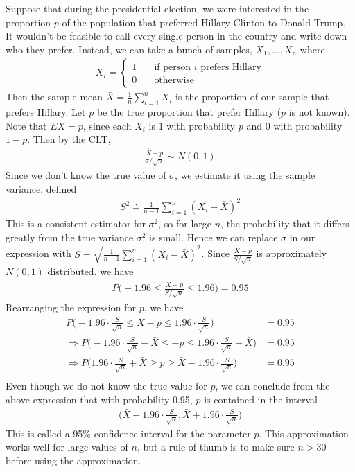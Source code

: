 \documentclass{tufte-book}
\theoremstyle{definition}
\numberwithin{theorem}{section}
\numberwithin{definition}{section}
\numberwithin{lemma}{section}
\numberwithin{corollary}{section}
\numberwithin{proposition}{section}
\numberwithin{remark}{section}
\numberwithin{claim}{section}
\numberwithin{observation}{section}
\numberwithin{fact}{section}
\numberwithin{assumption}{section}
\numberwithin{example}{section}
\numberwithin{exercise}{section}
\begin{document}
Suppose that during the presidential election, we were interested in the proportion $p$ of the population that preferred Hillary Clinton to Donald Trump. It wouldn't be feasible to call every single person in the country and write down who they prefer. Instead, we can take a bunch of samples, $X_1,\dots,X_n$ where
\begin{align*}
X_i = \begin{cases}
1 \hspace{1em} &\text{if person $i$ prefers Hillary} \\
0 &\text{otherwise}
\end{cases}
\end{align*}
Then the sample mean $\bar{X} = \frac{1}{n} \sum_{i=1}^n X_i$ is the proportion of our sample that prefers Hillary. Let $p$ be the true proportion that prefer Hillary ($p$ is not known). Note that $E\bar{X} = p$, since each $X_i$ is 1 with probability $p$ and 0 with probability $1-p$. Then by the CLT,
\begin{align*}
\frac{\bar{X}-p}{\sigma/\sqrt{n}} \sim N(0,1)
\end{align*}
Since we don't know the true value of $\sigma$, we estimate it using the sample variance, defined
\begin{align*}
S^2 \doteq \frac{1}{n-1} \sum_{i=1}^n (X_i - \bar{X})^2
\end{align*}
This is a consistent estimator for $\sigma^2$, so for large $n$, the probability that it differs greatly from the true variance $\sigma^2$ is small. Hence we can replace $\sigma$ in our expression with $S = \sqrt{\frac{1}{n-1}\sum_{i=1}^n (X_i - \bar{X})^2}$. Since $\frac{\bar{X}-p}{S/\sqrt{n}}$ is approximately $N(0,1)$ distributed, we have
\begin{align*}
P\Big(-1.96 \leq \frac{\bar{X}-p}{S/\sqrt{n}} \leq 1.96\Big) = 0.95
\end{align*}
Rearranging the expression for $p$, we have
\begin{align*}
P\Big(-1.96\cdot \frac{S}{\sqrt{n}} \leq \bar{X}-p \leq 1.96\cdot \frac{S}{\sqrt{n}}\Big) &= 0.95 \\
\Rightarrow P\Big(-1.96\cdot \frac{S}{\sqrt{n}} - \bar{X} \leq -p \leq 1.96\cdot \frac{S}{\sqrt{n}} - \bar{X}\Big) &= 0.95 \\
\Rightarrow P\Big(1.96\cdot \frac{S}{\sqrt{n}} + \bar{X} \geq p \geq \bar{X}-1.96\cdot \frac{S}{\sqrt{n}} \Big) &= 0.95 \\
\end{align*}
Even though we do not know the true value for $p$, we can conclude from the above expression that with probability 0.95, $p$ is contained in the interval
\begin{align*}
\Big(\bar{X} - 1.96 \cdot \frac{S}{\sqrt{n}}, \bar{X} + 1.96 \cdot \frac{S}{\sqrt{n}} \Big)
\end{align*}
This is called a 95\% confidence interval for the parameter $p$. This approximation works well for large values of $n$, but a rule of thumb is to make sure $n > 30$ before using the approximation.
\end{document}
